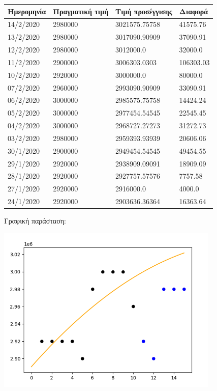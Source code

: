 \documentclass[a4paper,11pt]{article}
\begin{document}
	
	\begin{tabular}{| l | l | l | l |}
	\hline
	Ημερομηνία & Πραγματική τιμή & Τιμή προσέγγισης & Διαφορά
	\\ \hline
	14/2/2020 & 2980000 & 3021575.75758 & 41575.76
	\\ \hline
	13/2/2020 & 2980000 & 3017090.90909 & 37090.91
	\\ \hline
	12/2/2020 & 2980000 & 3012000.0 & 32000.0
	\\ \hline
	11/2/2020 & 2900000 & 3006303.0303 & 106303.03
	\\ \hline
	10/2/2020 & 2920000 & 3000000.0 & 80000.0
	\\ \hline
	07/2/2020 & 2960000 & 2993090.90909 & 33090.91
	\\ \hline
	06/2/2020 & 3000000 & 2985575.75758 & 14424.24
	\\ \hline
	05/2/2020 & 3000000 & 2977454.54545 & 22545.45
	\\ \hline
	04/2/2020 & 3000000 & 2968727.27273 & 31272.73
	\\ \hline
	03/2/2020 & 2980000 & 2959393.93939 & 20606.06
	\\ \hline
	30/1/2020 & 2900000 & 2949454.54545 & 49454.55
	\\ \hline
	29/1/2020 & 2920000 & 2938909.09091 & 18909.09
	\\ \hline
	28/1/2020 & 2920000 & 2927757.57576 & 7757.58
	\\ \hline
	27/1/2020 & 2920000 & 2916000.0 & 4000.0
	\\ \hline
	24/1/2020 & 2920000 & 2903636.36364 & 16363.64
	\\ \hline
	\end{tabular}

	\hfill \break
	
	Γραφική παράσταση:
	
	\includegraphics[height=8cm]{karel-2-alt.png}
	
\end{document}
